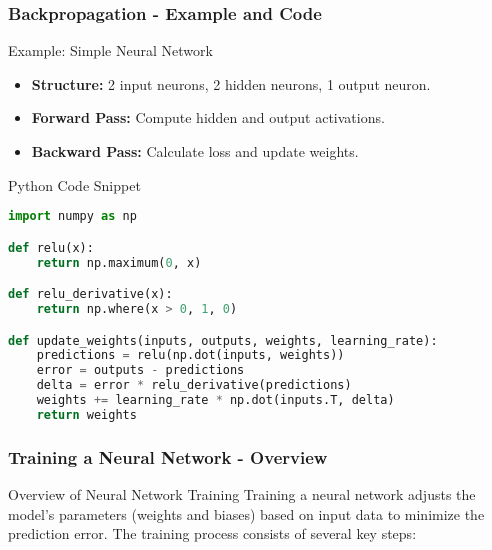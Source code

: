 \documentclass[aspectratio=169]{beamer}
\begin{document}
\begin{frame}[fragile]
    \frametitle{Backpropagation - Example and Code}
    \begin{block}{Example: Simple Neural Network}
        \begin{itemize}
            \item \textbf{Structure:} 2 input neurons, 2 hidden neurons, 1 output neuron.
            \item \textbf{Forward Pass:} Compute hidden and output activations.
            \item \textbf{Backward Pass:} Calculate loss and update weights.
        \end{itemize}
    \end{block}
    
    \begin{block}{Python Code Snippet}
    \begin{lstlisting}[language=Python]
import numpy as np

def relu(x):
    return np.maximum(0, x)

def relu_derivative(x):
    return np.where(x > 0, 1, 0)

def update_weights(inputs, outputs, weights, learning_rate):
    predictions = relu(np.dot(inputs, weights))
    error = outputs - predictions
    delta = error * relu_derivative(predictions)
    weights += learning_rate * np.dot(inputs.T, delta)
    return weights
    \end{lstlisting}
    \end{block}
\end{frame}

\begin{frame}[fragile]
    \frametitle{Training a Neural Network - Overview}
    \begin{block}{Overview of Neural Network Training}
        Training a neural network adjusts the model's parameters (weights and biases) based on input data to minimize the prediction error. The training process consists of several key steps:
    \end{block}
\end{frame}
\end{document}
